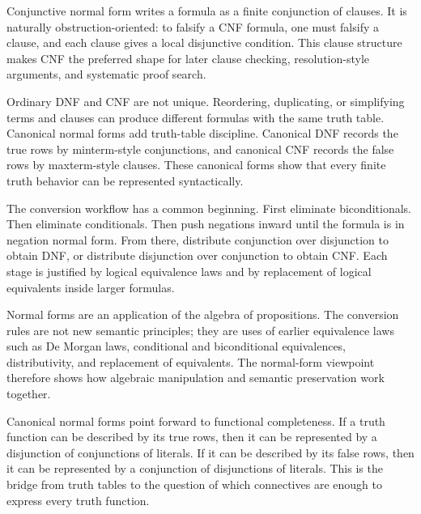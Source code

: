 \begin{remark*}
Conjunctive normal form writes a formula as a finite conjunction of clauses. It
is naturally obstruction-oriented: to falsify a CNF formula, one must falsify a
clause, and each clause gives a local disjunctive condition. This clause
structure makes CNF the preferred shape for later clause checking,
resolution-style arguments, and systematic proof search.
\end{remark*}

\begin{remark*}
Ordinary DNF and CNF are not unique. Reordering, duplicating, or simplifying
terms and clauses can produce different formulas with the same truth table.
Canonical normal forms add truth-table discipline. Canonical DNF records the
true rows by minterm-style conjunctions, and canonical CNF records the false
rows by maxterm-style clauses. These canonical forms show that every finite
truth behavior can be represented syntactically.
\end{remark*}

\begin{remark*}
The conversion workflow has a common beginning. First eliminate
biconditionals. Then eliminate conditionals. Then push negations inward until
the formula is in negation normal form. From there, distribute conjunction over
disjunction to obtain DNF, or distribute disjunction over conjunction to obtain
CNF. Each stage is justified by logical equivalence laws and by replacement of
logical equivalents inside larger formulas.
\end{remark*}

\begin{remark*}
Normal forms are an application of the algebra of propositions. The conversion
rules are not new semantic principles; they are uses of earlier equivalence
laws such as De Morgan laws, conditional and biconditional equivalences,
distributivity, and replacement of equivalents. The normal-form viewpoint
therefore shows how algebraic manipulation and semantic preservation work
together.
\end{remark*}

\begin{remark*}
Canonical normal forms point forward to functional completeness. If a truth
function can be described by its true rows, then it can be represented by a
disjunction of conjunctions of literals. If it can be described by its false
rows, then it can be represented by a conjunction of disjunctions of literals.
This is the bridge from truth tables to the question of which connectives are
enough to express every truth function.
\end{remark*}

